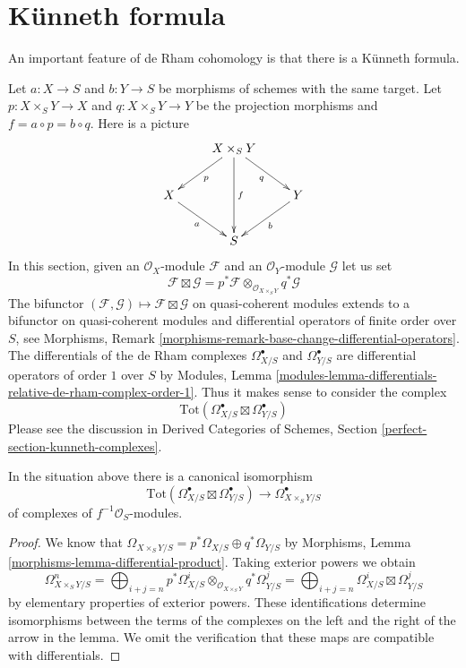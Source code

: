 \section{K\"unneth formula}
\label{section-kunneth}

\noindent
An important feature of de Rham cohomology is that there is a
K\"unneth formula.

\medskip\noindent
Let $a : X \to S$ and $b : Y \to S$ be morphisms of schemes with the same
target. Let $p : X \times_S Y \to X$ and $q : X \times_S Y \to Y$ be the
projection morphisms and $f = a \circ p = b \circ q$. Here is a picture
$$
\xymatrix{
& X \times_S Y \ar[ld]^p \ar[rd]_q \ar[dd]^f \\
X \ar[rd]_a & & Y \ar[ld]^b \\
& S
}
$$
In this section, given an $\mathcal{O}_X$-module $\mathcal{F}$
and an $\mathcal{O}_Y$-module $\mathcal{G}$ let us set
$$
\mathcal{F} \boxtimes \mathcal{G} =
p^*\mathcal{F} \otimes_{\mathcal{O}_{X \times_S Y}} q^*\mathcal{G}
$$
The bifunctor
$(\mathcal{F}, \mathcal{G}) \mapsto \mathcal{F} \boxtimes \mathcal{G}$
on quasi-coherent modules extends to a bifunctor on quasi-coherent modules
and differential operators of finite order over $S$, see
Morphisms, Remark \ref{morphisms-remark-base-change-differential-operators}.
The differentials of the de Rham complexes $\Omega^\bullet_{X/S}$ and
$\Omega^\bullet_{Y/S}$ are differential operators of order $1$
over $S$ by Modules, Lemma
\ref{modules-lemma-differentials-relative-de-rham-complex-order-1}.
Thus it makes sense to consider the complex
$$
\text{Tot}(\Omega^\bullet_{X/S} \boxtimes \Omega^\bullet_{Y/S})
$$
Please see the discussion in Derived Categories of Schemes, Section
\ref{perfect-section-kunneth-complexes}.

\begin{lemma}
\label{lemma-de-rham-complex-product}
In the situation above there is a canonical isomorphism
$$
\text{Tot}(\Omega^\bullet_{X/S} \boxtimes \Omega^\bullet_{Y/S})
\longrightarrow
\Omega^\bullet_{X \times_S Y/S}
$$
of complexes of $f^{-1}\mathcal{O}_S$-modules.
\end{lemma}

\begin{proof}
We know that
$
\Omega_{X \times_S Y/S} = p^*\Omega_{X/S} \oplus q^*\Omega_{Y/S}
$
by Morphisms, Lemma \ref{morphisms-lemma-differential-product}.
Taking exterior powers we obtain
$$
\Omega^n_{X \times_S Y/S} =
\bigoplus\nolimits_{i + j = n}
p^*\Omega^i_{X/S} \otimes_{\mathcal{O}_{X \times_S Y}} q^*\Omega^j_{Y/S} =
\bigoplus\nolimits_{i + j = n}
\Omega^i_{X/S} \boxtimes \Omega^j_{Y/S}
$$
by elementary properties of exterior powers. These identifications determine
isomorphisms between the terms of the complexes on the left and the right
of the arrow in the lemma. We omit the verification that these maps
are compatible with differentials.
\end{proof}

